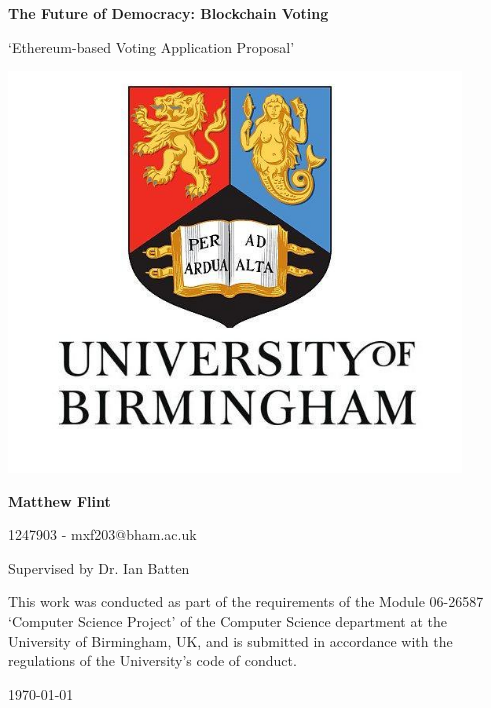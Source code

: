 \documentclass{article}
\begin{document}
    \begin{center}
        \Large
        \textbf{The Future of Democracy: Blockchain Voting}
        
        \vspace{0.2cm}
        \large
        `Ethereum-based Voting Application Proposal'
        
        \vspace{1cm}
        \includegraphics[width=0.9\textwidth]{university}

        \vfill
        
        \large
        \textbf{Matthew Flint}
        
        \vspace{0.3cm}
        \normalsize
        1247903 - mxf203@bham.ac.uk
        
        \vspace{0.3cm}
        \normalsize
        Supervised by Dr. Ian Batten
        
        \vspace{0.5cm}
		This work was conducted as part of the requirements of the Module 06-26587 `Computer Science Project' of the Computer Science department at the University of Birmingham, UK, and is submitted in accordance with the regulations of the University's code of conduct.
		
		\vspace{0.2cm}
		\today
		
    \end{center}
    \newpage
\end{document}
